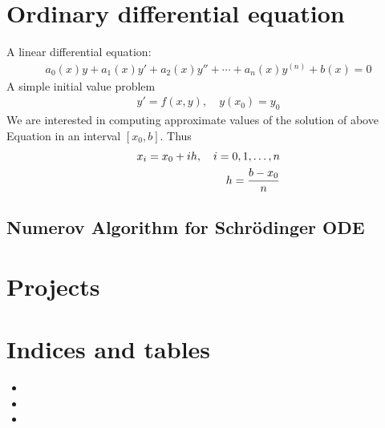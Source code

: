 \documentclass[letterpaper,10pt,english]{sphinxmanual}
\begin{document}
\chapter{Ordinary differential equation}
\label{\detokenize{ODE/ODE:ordinary-differential-equation}}\label{\detokenize{ODE/ODE::doc}}
\sphinxAtStartPar
A linear differential equation:
\begin{equation*}
\begin{split}a_{0}(x)y+a_{1}(x)y'+a_{2}(x)y''+\cdots +a_{n}(x)y^{(n)}+b(x)=0\end{split}
\end{equation*}
\sphinxAtStartPar
A simple initial value problem
\begin{equation*}
\begin{split}y'=f(x,y),\quad y(x_0)=y_0\end{split}
\end{equation*}
\sphinxAtStartPar
We are interested in computing approximate values of the solution of above Equation in an interval \([x_0,b]\). Thus
\begin{equation*}
\begin{split}x_i=x_0+ih,\quad i=0,1, \dots,n \\
h={b-x_0\over n}\end{split}
\end{equation*}

\section{Numerov Algorithm for Schrödinger ODE}
\label{\detokenize{ODE/ODE:numerov-algorithm-for-schrodinger-ode}}
\sphinxstepscope


\chapter{Projects}
\label{\detokenize{Projects/Projects:projects}}\label{\detokenize{Projects/Projects::doc}}

\chapter{Indices and tables}
\label{\detokenize{index:indices-and-tables}}\begin{itemize}
\item {} 
\sphinxAtStartPar
{}

\item {} 
\sphinxAtStartPar
{}

\item {} 
\sphinxAtStartPar
{}

\end{itemize}



\renewcommand{\indexname}{Index}
\printindex
\end{document}
